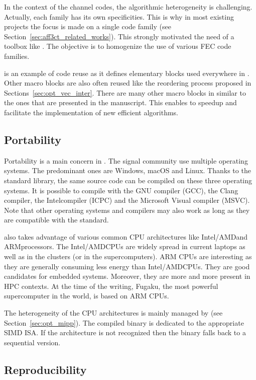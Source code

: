 In the context of the channel codes, the algorithmic heterogeneity is
challenging. Actually, each family has its own specificities. This is why in
most existing projects the focus is made on a single code family (see
Section~\ref{sec:aff3ct_related_works}). This strongly motivated the need of a
toolbox like \AFFECT. The objective is to homogenize the use of various FEC code
families.

\MIPP is an example of code reuse as it defines elementary blocks used
everywhere in \AFFECT. Other macro blocks are also often reused like the
reordering process proposed in Sections~\ref{sec:opt_vec_inter}. There are many
other macro blocks in \AFFECT similar to the ones that are presented in the
manuscript. This enables to speedup and facilitate the implementation of new
efficient algorithms.

\subsection{Portability}

Portability is a main concern in \AFFECT. The signal community use multiple
operating systems. The predominant ones are Windows, macOS and Linux. Thanks to
the  standard library, the same \AFFECT source code can be compiled on
these three operating systems. It is possible to compile with the GNU compiler
(GCC), the Clang compiler, the Intel\R \Cxx compiler (ICPC) and the Microsoft\R
Visual compiler (MSVC). Note that other operating systems and compilers may also
work as long as they are compatible with the  standard.

\AFFECT also takes advantage of various common CPU architectures like
Intel\R/AMD\R and ARM\R processors. The Intel\R/AMD\R CPUs are widely spread
in current laptops as well as in the clusters (or in the supercomputers). ARM\R
CPUs are interesting as they are generally consuming less energy than
Intel\R/AMD\R CPUs. They are good candidates for embedded systems. Moreover,
they are more and more present in HPC contexts. At the time of the writing,
Fugaku, the most powerful supercomputer in the world, is based on ARM CPUs.

The heterogeneity of the CPU architectures is mainly managed by \MIPP (see
Section~\ref{sec:opt_mipp}). The compiled binary is dedicated to the appropriate
SIMD ISA. If the architecture is not recognized then the \AFFECT binary
falls back to a sequential version.

\subsection{Reproducibility}

